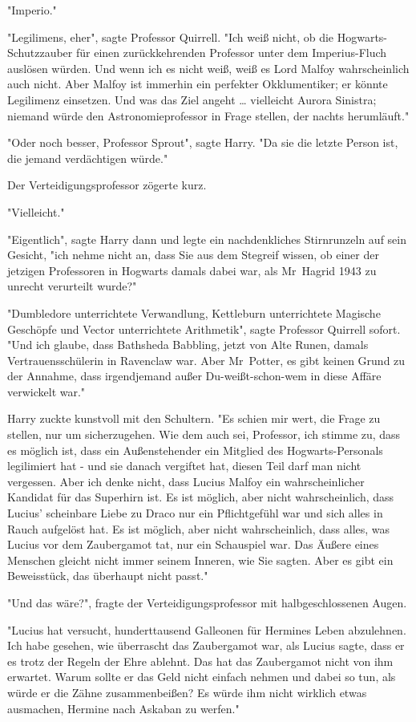 {"Imperio."

"Legilimens, eher", sagte Professor Quirrell. "Ich weiß nicht, ob die Hogwarts-Schutzzauber für einen zurückkehrenden Professor unter dem Imperius-Fluch auslösen würden. Und wenn ich es nicht weiß, weiß es Lord Malfoy wahrscheinlich auch nicht. Aber Malfoy ist immerhin ein perfekter Okklumentiker; er könnte Legilimenz einsetzen. Und was das Ziel angeht … vielleicht Aurora Sinistra; niemand würde den Astronomieprofessor in Frage stellen, der nachts herumläuft."

"Oder noch besser, Professor Sprout", sagte Harry. "Da sie die letzte Person ist, die jemand verdächtigen würde."

Der Verteidigungsprofessor zögerte kurz.

"Vielleicht."

"Eigentlich", sagte Harry dann und legte ein nachdenkliches Stirnrunzeln auf sein Gesicht, "ich nehme nicht an, dass Sie aus dem Stegreif wissen, ob einer der jetzigen Professoren in Hogwarts damals dabei war, als Mr~Hagrid 1943 zu unrecht verurteilt wurde?"

"Dumbledore unterrichtete Verwandlung, Kettleburn unterrichtete Magische Geschöpfe und Vector unterrichtete Arithmetik", sagte Professor Quirrell sofort. "Und ich glaube, dass Bathsheda Babbling, jetzt von Alte Runen, damals Vertrauensschülerin in Ravenclaw war. Aber Mr~Potter, es gibt keinen Grund zu der Annahme, dass irgendjemand außer Du-weißt-schon-wem in diese Affäre verwickelt war."

Harry zuckte kunstvoll mit den Schultern. "Es schien mir wert, die Frage zu stellen, nur um sicherzugehen. Wie dem auch sei, Professor, ich stimme zu, dass es möglich ist, dass ein Außenstehender ein Mitglied des Hogwarts-Personals legilimiert hat - und sie danach vergiftet hat, diesen Teil darf man nicht vergessen. Aber ich denke nicht, dass Lucius Malfoy ein wahrscheinlicher Kandidat für das Superhirn ist. Es ist möglich, aber nicht wahrscheinlich, dass Lucius' scheinbare Liebe zu Draco nur ein Pflichtgefühl war und sich alles in Rauch aufgelöst hat. Es ist möglich, aber nicht wahrscheinlich, dass alles, was Lucius vor dem Zaubergamot tat, nur ein Schauspiel war. Das Äußere eines Menschen gleicht nicht immer seinem Inneren, wie Sie sagten. Aber es gibt ein Beweisstück, das überhaupt nicht passt."

"Und das wäre?", fragte der Verteidigungsprofessor mit halbgeschlossenen Augen.

"Lucius hat versucht, hunderttausend Galleonen für Hermines Leben abzulehnen. Ich habe gesehen, wie überrascht das Zaubergamot war, als Lucius sagte, dass er es trotz der Regeln der Ehre ablehnt. Das hat das Zaubergamot nicht von ihm erwartet. Warum sollte er das Geld nicht einfach nehmen und dabei so tun, als würde er die Zähne zusammenbeißen? Es würde ihm nicht wirklich etwas ausmachen, Hermine nach Askaban zu werfen."

}
